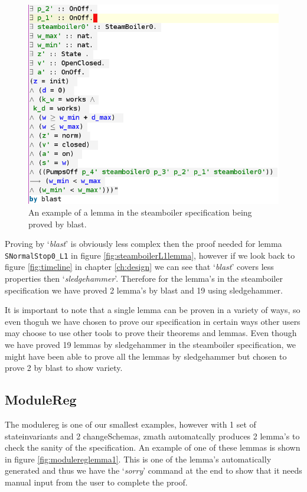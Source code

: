 \begin{figure}[H]
\centering
\includegraphics[scale=0.6]{Figures/Evaluation/steamboilerblastlemma.png}
\caption{An example of a lemma in the steamboiler specification being proved by blast. \label{fig:blastprovenlemma}}
\end{figure}

Proving by `\emph{blast}' is obviously less complex then the proof needed for lemma \verb|SNormalStop0_L1| in figure \ref{fig:steamboilerL1lemma}, however if we look back to figure \ref{fig:timeline} in chapter \ref{ch:design} we can see that `\emph{blast}' covers less properties then `\emph{sledgehammer}'. Therefore for the lemma's in the steamboiler specification we have proved 2 lemma's by blast and 19 using sledgehammer. 

It is important to note that a single lemma can be proven in a variety of ways, so even thoguh we have chosen to prove our specification in certain ways other users may choose to use other tools to prove their theorems and lemmas. Even though we have proved 19 lemmas by sledgehammer in the steamboiler specification, we might have been able to prove all the lemmas by sledgehammer but chosen to prove 2 by blast to show variety.

\subsection{ModuleReg}

The modulereg is one of our smallest examples, however with 1 set of stateinvariants and 2 changeSchemas, \gls{zmath} automatcally produces 2 lemma's to check the sanity of the specification. An example of one of these lemmas is shown in figure \ref{fig:modulereglemma1}. This is one of the lemma's automatically generated and thus we have the `\emph{sorry}' command at the end to show that it needs manual input from the user to complete the proof.

